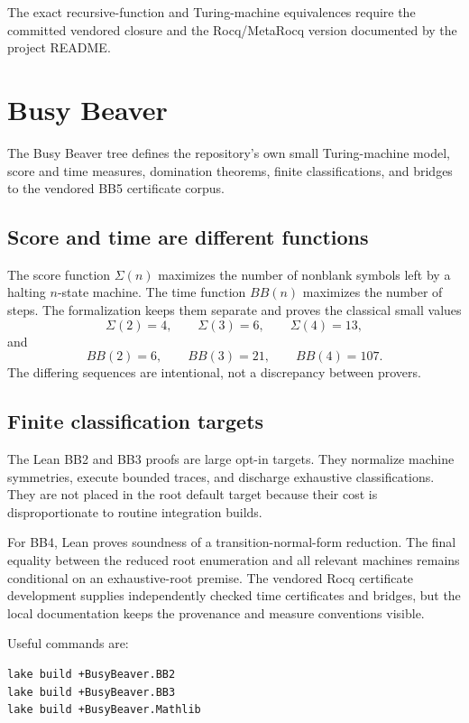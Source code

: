\documentclass[
  10pt,
  a4paper,
  twoside,
  open=any,
  parskip=half,
  headings=big
]{scrreprt}
\begin{document}
The exact recursive-function and Turing-machine equivalences require the committed vendored closure and the Rocq/MetaRocq version documented by the project README.

\section{Busy Beaver}
\label{sec:busy-beaver}

The Busy Beaver tree defines the repository's own small Turing-machine model, score and time measures, domination theorems, finite classifications, and bridges to the vendored BB5 certificate corpus.

\subsection{Score and time are different functions}

The score function $\Sigma(n)$ maximizes the number of nonblank symbols left by a halting $n$-state machine. The time function $BB(n)$ maximizes the number of steps. The formalization keeps them separate and proves the classical small values
\[
\Sigma(2)=4,
\qquad \Sigma(3)=6,
\qquad \Sigma(4)=13,
\]
and
\[
BB(2)=6,
\qquad BB(3)=21,
\qquad BB(4)=107.
\]
The differing sequences are intentional, not a discrepancy between provers.

\subsection{Finite classification targets}

The Lean BB2 and BB3 proofs are large opt-in targets. They normalize machine symmetries, execute bounded traces, and discharge exhaustive classifications. They are not placed in the root default target because their cost is disproportionate to routine integration builds.

For BB4, Lean proves soundness of a transition-normal-form reduction. The final equality between the reduced root enumeration and all relevant machines remains conditional on an exhaustive-root premise. The vendored Rocq certificate development supplies independently checked time certificates and bridges, but the local documentation keeps the provenance and measure conventions visible.

Useful commands are:

\begin{lstlisting}[language=bash]
lake build +BusyBeaver.BB2
lake build +BusyBeaver.BB3
lake build +BusyBeaver.Mathlib
\end{lstlisting}
\end{document}

